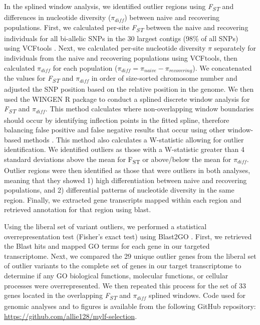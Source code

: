 \documentclass[9pt,twocolumn,twoside,lineno]{pnas-new}
\begin{document}
{In the splined window analysis, we identified outlier regions using
\emph{F\textsubscript{ST}} and differences in nucleotide diversity
(\(\pi_{diff}\)) between naive and recovering populations. First, we
calculated per-site \emph{F\textsubscript{ST}} between the naive and
recovering individuals for all bi-allelic SNPs in the 30 largest contigs
(98\% of all SNPs) using VCFtools \citep{danecek2011}. Next, we
calculated per-site nucleotide diversity \(\pi\) separately for
individuals from the naive and recovering populations using VCFtools,
then calculated \(\pi_{diff}\) for each population
(\(\pi_{diff} = \pi_{naive} - \pi_{recovering}\)). We concatenated the
values for \emph{F\textsubscript{ST}} and \(\pi_{diff}\) in order of
size-sorted chromosome number and adjusted the SNP position based on the
relative position in the genome. We then used the WINGEN R package
\citep{bishop2023} to conduct a splined discrete window analysis for
\emph{F\textsubscript{ST}} and \(\pi_{diff}\). This method calculates
where non-overlapping window boundaries should occur by identifying
inflection points in the fitted spline, therefore balancing false
positive and false negative results that occur using other window-based
methods \citep{beissinger2015} . This method also calculates a
W-statistic allowing for outlier identification. We identified outliers
as those with a W-statistic greater than 4 standard deviations above the
mean for F\textsubscript{ST} or above/below the mean for \(\pi_{diff}\).
Outlier regions were then identified as those that were outliers in both
analyses, meaning that they showed 1) high differentiation between naive
and recovering populations, and 2) differential patterns of nucleotide
diversity in the same region. Finally, we extracted gene transcripts
mapped within each region and retrieved annotation for that region using
blast.

Using the liberal set of variant outliers, we performed a statistical
overrepresentation test (Fisher's exact test) using Blast2GO
\citep{conesa2005}. First, we retrieved the Blast hits and mapped GO
terms for each gene in our targeted transcriptome. Next, we compared the
29 unique outlier genes from the liberal set of outlier variants to the
complete set of genes in our target transcriptome to determine if any GO
biological functions, molecular functions, or cellular processes were
overrepresented. We then repeated this process for the set of 33 genes
located in the overlapping \emph{F\textsubscript{ST}} and \(\pi_{diff}\)
splined windows. Code used for genomic analyses and to figures is
available from the following GitHub repository:
\url{https://github.com/allie128/mylf-selection}.

}
\end{document}
